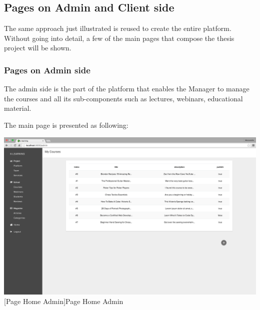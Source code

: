 



\newpage
\subsection {Pages on Admin and Client side}
\label{subsec:pages}
The same approach just illustrated is reused to create the entire platform.
Without going into detail, a few of the main pages that compose the thesis project will be shown.

\subsubsection {Pages on Admin side}
\label{subsec:Admin_side}

The admin side is the part of the platform that enables the Manager to manage the courses and all its sub-components such as lectures, webinars, educational material.

The main page is presented as following:
\\

\begin{minipage}{\linewidth}
    \centering
    \includegraphics[width=0.9\linewidth]{images/chapter4/page-admin.png}
    [Page Home Admin]{Page Home Admin}
\end{minipage}
\\

